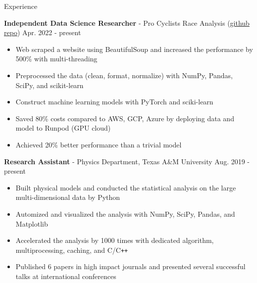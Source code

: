 \documentclass{resume}
\begin{document}
\vspace{-0.25em}
\begin{rSection}{Experience}
    \vspace{-1.5em}
    \item \textbf{Independent Data Science Researcher} - {Pro Cyclists Race Analysis} (\href{https://github.com/noctildon/pro_cyclists}{github repo}) \hfill Apr. 2022 - present
        \begin{itemize}
        \item Web scraped a website using BeautifulSoup and increased the performance by 500\% with multi-threading
        \item Preprocessed the data (clean, format, normalize) with NumPy, Pandas, SciPy, and scikit-learn
        \item Construct machine learning models with PyTorch and sciki-learn
        \item Saved 80\% costs compared to AWS, GCP, Azure by deploying data and model to Runpod (GPU cloud)
        \item Achieved 20\% better performance than a trivial model
        \end{itemize}

    \item \textbf{Research Assistant} - Physics Department, Texas A\&M University \hfill Aug. 2019 - present
        \begin{itemize}
        \item Built physical models and conducted the statistical analysis on the large multi-dimensional data by Python
        \item Automized and visualized the analysis with NumPy, SciPy, Pandas, and Matplotlib
        \item Accelerated the analysis by 1000 times with dedicated algorithm, multiprocessing, caching, and C/C\texttt{++}
        \item Published 6 papers in high impact journals and presented several successful talks at international conferences
        \end{itemize}


\end{rSection}
\end{document}
